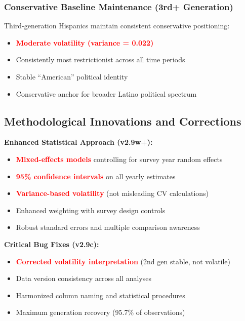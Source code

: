 \subsubsection{Conservative Baseline Maintenance (3rd+ Generation)}
Third-generation Hispanics maintain consistent conservative positioning:
\begin{itemize}
    \item \textcolor{red}{\textbf{Moderate volatility (variance = 0.022)}}
    \item Consistently most restrictionist across all time periods
    \item Stable ``American'' political identity
    \item Conservative anchor for broader Latino political spectrum
\end{itemize}


\subsection{Methodological Innovations and Corrections}

\textbf{Enhanced Statistical Approach (v2.9w+):}
\begin{itemize}
    \item \textcolor{red}{\textbf{Mixed-effects models}} controlling for survey year random effects
    \item \textcolor{red}{\textbf{95\% confidence intervals}} on all yearly estimates
    \item \textcolor{red}{\textbf{Variance-based volatility}} (not misleading CV calculations)
    \item Enhanced weighting with survey design controls
    \item Robust standard errors and multiple comparison awareness
\end{itemize}

\textbf{Critical Bug Fixes (v2.9c):}
\begin{itemize}
    \item \textcolor{red}{\textbf{Corrected volatility interpretation}} (2nd gen stable, not volatile)
    \item Data version consistency across all analyses
    \item Harmonized column naming and statistical procedures
    \item Maximum generation recovery (95.7\% of observations)
\end{itemize}

